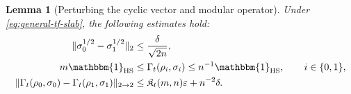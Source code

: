 \documentclass[11pt]{article}
\newtheorem{lemma}[lemma]{Lemma}
\theoremstyle{remark}
\newcommand{\1}{\mathbbm{1}}
\begin{document}
\begin{lemma}[Perturbing the cyclic vector and modular operator]
\label{lemma:general-tf-perturbations}
Under \eqref{eq:general-tf-slab}, the following estimates hold:
\begin{align}
 \lVert\sigma_0^{1/2}-\sigma_1^{1/2}\rVert_2
 &\leq\frac{\delta}{\sqrt{2n}},
 \label{eq:general-tf-vector-bound}\\
 m\1_{\rm HS}
 &\leq\Gamma_t(\rho_i,\sigma_i)
 \leq n^{-1}\1_{\rm HS},
 \qquad i\in\{0,1\},
 \label{eq:general-tf-Gamma-spectrum}\\
 \lVert\Gamma_t(\rho_0,\sigma_0)
       -\Gamma_t(\rho_1,\sigma_1)\rVert_{2\to2}
 &\leq
 \mathfrak K_t(m,n)\varepsilon+n^{-2}\delta.
 \label{eq:general-tf-Gamma-bound}
\end{align}
\end{lemma}
\end{document}

